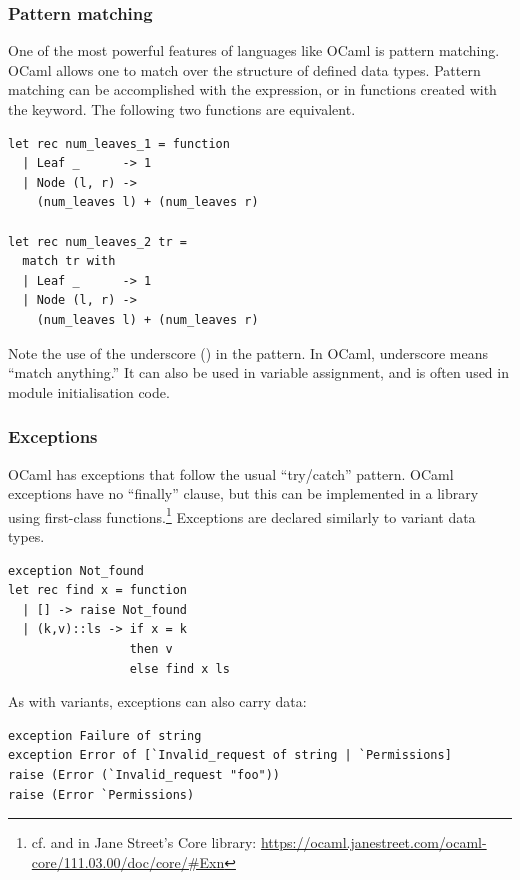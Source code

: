 \subsubsection{Pattern matching}

One of the most powerful features of languages like OCaml is pattern
matching. OCaml allows one to match over the structure of defined data
types. Pattern matching can be accomplished with the
expression, or in functions created with the 
keyword. The following two functions are equivalent.

\begin{lstlisting}
let rec num_leaves_1 = function
  | Leaf _      -> 1
  | Node (l, r) ->
    (num_leaves l) + (num_leaves r)

let rec num_leaves_2 tr =
  match tr with
  | Leaf _      -> 1
  | Node (l, r) ->
    (num_leaves l) + (num_leaves r)
\end{lstlisting}

Note the use of the underscore (\code{_}) in the 
pattern. In OCaml, underscore means ``match anything.'' It can also be
used in variable assignment, and is often used in module
initialisation code.

\subsubsection{Exceptions}

OCaml has exceptions that follow the usual ``try/catch''
pattern. OCaml exceptions have no ``finally'' clause, but this can be
implemented in a library using first-class
functions.\footnote{cf.  and  in Jane
  Street's Core library:
  \url{https://ocaml.janestreet.com/ocaml-core/111.03.00/doc/core/\#Exn}}
Exceptions are declared similarly to variant data types.

\begin{lstlisting}
exception Not_found
let rec find x = function
  | [] -> raise Not_found
  | (k,v)::ls -> if x = k
                 then v
                 else find x ls
\end{lstlisting}

As with variants, exceptions can also carry data:

\begin{lstlisting}
exception Failure of string
exception Error of [`Invalid_request of string | `Permissions]
raise (Error (`Invalid_request "foo"))
raise (Error `Permissions)
\end{lstlisting}


